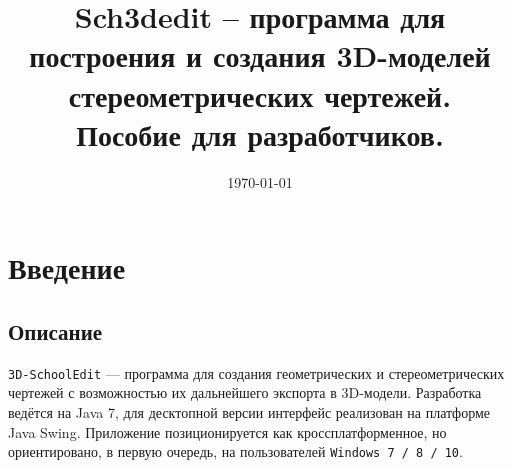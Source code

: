 \documentclass[fontsize=10px, a4paper, openany]{scrbook}
\author{}
\title{Sch3dedit -- программа для построения и создания 3D-моделей стереометрических чертежей.\\Пособие для разработчиков.}
\date{\today}
\begin{document}
\maketitle
\tableofcontents
\chapter*{Введение}

\section*{Описание}
\texttt{3D-SchoolEdit} --- программа для создания геометрических и стереометрических чертежей с возможностью их дальнейшего экспорта в 3D-модели. Разработка ведётся на Java 7, для десктопной версии интерфейс реализован на платформе Java Swing. Приложение позиционируется как кроссплатформенное, но ориентировано, в первую очередь, на пользователей \texttt{Windows 7 / 8 / 10}.
\end{document}
